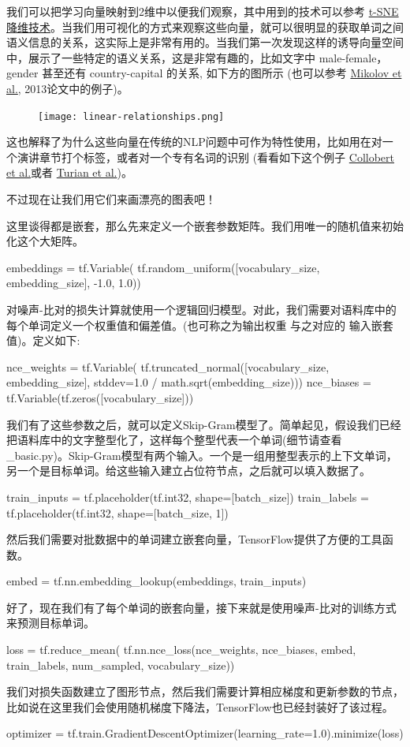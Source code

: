 我们可以把学习向量映射到2维中以便我们观察，其中用到的技术可以参考 \href{http://lvdmaaten.github.io/tsne/}{t-SNE 降维技术}。当我们用可视化的方式来观察这些向量，就可以很明显的获取单词之间语义信息的关系，这实际上是非常有用的。当我们第一次发现这样的诱导向量空间中，展示了一些特定的语义关系，这是非常有趣的，比如文字中 male-female，gender 甚至还有 country-capital 的关系, 如下方的图所示 (也可以参考 \href{http://www.aclweb.org/anthology/N13-1090}{Mikolov et al.}, 2013论文中的例子)。
\begin{center}
\begin{figure}[H]
\texttt{[image: linear-relationships.png]}
\end{figure}
\end{center}
这也解释了为什么这些向量在传统的NLP问题中可作为特性使用，比如用在对一个演讲章节打个标签，或者对一个专有名词的识别 (看看如下这个例子 \href{https://arxiv.org/pdf/1103.0398v1.pdf}{Collobert et al.}或者 \href{http://www.aclweb.org/anthology/P10-1040}{Turian et al.})。

不过现在让我们用它们来画漂亮的图表吧！

这里谈得都是嵌套，那么先来定义一个嵌套参数矩阵。我们用唯一的随机值来初始化这个大矩阵。
\begin{python}
embeddings = tf.Variable(
    tf.random_uniform([vocabulary_size, embedding_size], -1.0, 1.0))
\end{python}
对噪声-比对的损失计算就使用一个逻辑回归模型。对此，我们需要对语料库中的每个单词定义一个权重值和偏差值。(也可称之为输出权重 与之对应的 输入嵌套值)。定义如下:
\begin{python}
nce_weights = tf.Variable(
  tf.truncated_normal([vocabulary_size, embedding_size],
                      stddev=1.0 / math.sqrt(embedding_size)))
nce_biases = tf.Variable(tf.zeros([vocabulary_size]))
\end{python}我们有了这些参数之后，就可以定义Skip-Gram模型了。简单起见，假设我们已经把语料库中的文字整型化了，这样每个整型代表一个单词(细节请查看\_basic.py)。Skip-Gram模型有两个输入。一个是一组用整型表示的上下文单词，另一个是目标单词。给这些输入建立占位符节点，之后就可以填入数据了。
\begin{python}
train_inputs = tf.placeholder(tf.int32, shape=[batch_size])
train_labels = tf.placeholder(tf.int32, shape=[batch_size, 1])
\end{python}
然后我们需要对批数据中的单词建立嵌套向量，TensorFlow提供了方便的工具函数。
\begin{python}
embed = tf.nn.embedding_lookup(embeddings, train_inputs)
\end{python}
好了，现在我们有了每个单词的嵌套向量，接下来就是使用噪声-比对的训练方式来预测目标单词。
\begin{python}
loss = tf.reduce_mean(
  tf.nn.nce_loss(nce_weights, nce_biases, embed, train_labels,
                 num_sampled, vocabulary_size))
\end{python}
我们对损失函数建立了图形节点，然后我们需要计算相应梯度和更新参数的节点，比如说在这里我们会使用随机梯度下降法，TensorFlow也已经封装好了该过程。
\begin{python}
optimizer = tf.train.GradientDescentOptimizer(learning_rate=1.0).minimize(loss)
\end{python}
